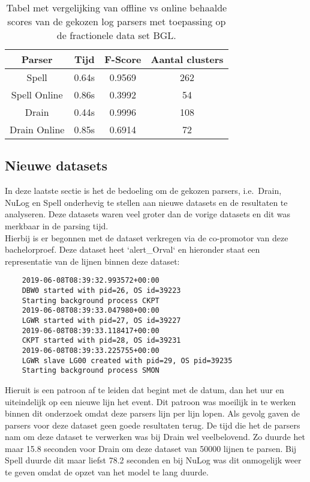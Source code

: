 \begin{table}[!htp]
    \caption{Tabel met vergelijking van offline vs online behaalde scores van de gekozen log parsers met toepassing op de fractionele data set BGL.}
    \label{table:onlinetabel}
    \begin{center}
        \begin{tabular}{||c | c | c | c||} 
            \hline
            Parser & Tijd & F-Score & Aantal clusters \\ [0.5ex] 
            \hline\hline
            
            Spell & 0.64s & 0.9569 & 262 \\
            
            Spell Online & 0.86s & 0.3992 & 54 \\
            
            Drain & 0.44s & 0.9996 & 108 \\
            
            Drain Online & 0.85s & 0.6914 & 72 \\

            \hline
        \end{tabular}
    \end{center}
\end{table}

\subsection{Nieuwe datasets}
In deze laatste sectie is het de bedoeling om de gekozen parsers, i.e.\ Drain, NuLog en Spell onderhevig te stellen aan nieuwe datasets en de resultaten te analyseren. Deze datasets waren veel groter dan de vorige datasets en dit was merkbaar in de parsing tijd.\\

Hierbij is er begonnen met de dataset verkregen via de co-promotor van deze bachelorproef. Deze dataset heet `alert\_Orval` en hieronder staat een representatie van de lijnen binnen deze dataset:
\begin{verbatim}
    2019-06-08T08:39:32.993572+00:00
    DBW0 started with pid=26, OS id=39223 
    Starting background process CKPT
    2019-06-08T08:39:33.047980+00:00
    LGWR started with pid=27, OS id=39227 
    2019-06-08T08:39:33.118417+00:00
    CKPT started with pid=28, OS id=39231 
    2019-06-08T08:39:33.225755+00:00
    LGWR slave LG00 created with pid=29, OS pid=39235
    Starting background process SMON
\end{verbatim}
Hieruit is een patroon af te leiden dat begint met de datum, dan het uur en uiteindelijk op een nieuwe lijn het event. Dit patroon was moeilijk in te werken binnen dit onderzoek omdat deze parsers lijn per lijn lopen. Als gevolg gaven de parsers voor deze dataset geen goede resultaten terug. De tijd die het de parsers nam om deze dataset te verwerken was bij Drain wel veelbelovend. Zo duurde het maar 15.8 seconden voor Drain om deze dataset van 50000 lijnen te parsen. Bij Spell duurde dit maar liefst 78.2 seconden en bij NuLog was dit onmogelijk weer te geven omdat de opzet van het model te lang duurde.\\

